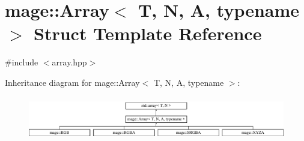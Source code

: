\hypertarget{structmage_1_1_array}{}\section{mage\+:\+:Array$<$ T, N, A, typename $>$ Struct Template Reference}
\label{structmage_1_1_array}


{\ttfamily \#include $<$array.\+hpp$>$}

Inheritance diagram for mage\+:\+:Array$<$ T, N, A, typename $>$\+:\begin{figure}[H]
\begin{center}
\leavevmode
\includegraphics[height=1.917808cm]{structmage_1_1_array}
\end{center}
\end{figure}

